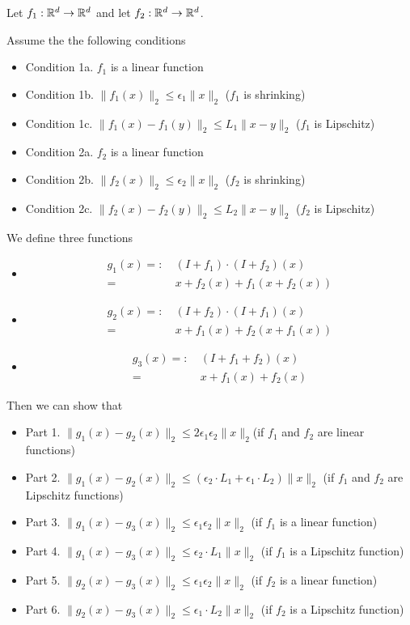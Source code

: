 \begin{lemma}
Let $f_1 : \mathbb{R}^d \rightarrow \mathbb{R}^d$ and let $f_2 : \mathbb{R}^d \rightarrow \mathbb{R}^d$.

Assume the the following conditions
\begin{itemize}
    \item Condition 1a. $f_1$ is a linear function 
    \item Condition 1b. $\| f_1(x) \|_2 \leq \epsilon_1 \| x \|_2$ ($f_1$ is shrinking)
    \item Condition 1c. $\| f_1 (x)  -f_1(y) \|_2 \leq L_1 \| x - y \|_2$ ($f_1$ is Lipschitz)
    \item Condition 2a. $f_2$ is a linear function 
    \item Condition 2b. $\| f_2(x) \|_2 \leq \epsilon_2 \| x \|_2$  ($f_2$ is shrinking)
    \item Condition 2c. $\| f_2 (x)  -f_2(y) \|_2 \leq L_2 \| x - y \|_2$ ($f_2$ is Lipschitz)
\end{itemize}

We define three functions
\begin{itemize}
\item 
\begin{align*}
g_1 (x) = : & ~ (I + f_1) \cdot (I + f_2) (x)  \\
= & ~ x + f_2(x) + f_1 ( x + f_2(x) )
\end{align*}
\item
\begin{align*}
g_2 (x) = : & ~ (I + f_2) \cdot (I + f_1) (x)  \\
= & ~ x + f_1(x) + f_2 ( x + f_1(x) )
\end{align*}
\item
\begin{align*}
g_3 (x) = : & ~ (I + f_1 + f_2) (x)  \\
= & ~ x + f_1(x) + f_2(x)
\end{align*}
\end{itemize}
Then we can show that
\begin{itemize}
    \item Part 1. $\| g_1 (x) - g_2 (x) \|_2 \leq 2 \epsilon_1 \epsilon_2 \| x \|_2$(if $f_1$ and $f_2$ are linear functions)
    \item Part 2. $\| g_1 (x) - g_2 (x) \|_2 \leq (\epsilon_2 \cdot L_1+ \epsilon_1 \cdot L_2) \| x \|_2  $  (if $f_1$ and $f_2$ are Lipschitz functions)
    \item Part 3. $\| g_1 (x) -g_3 (x) \|_2 \leq \epsilon_1 \epsilon_2 \| x \|_2$ (if $f_1$ is a linear function)
    \item Part 4. $\| g_1 (x) -g_3 (x) \|_2 \leq \epsilon_2 \cdot L_1 \| x \|_2$ (if $f_1$ is a Lipschitz function)
    \item Part 5.  $\| g_2 (x) -g_3 (x) \|_2 \leq \epsilon_1 \epsilon_2 \| x \|_2$ (if $f_2$ is a linear function)
    \item Part 6. $\| g_2 (x) -g_3 (x) \|_2 \leq \epsilon_1 \cdot L_2 \| x \|_2$ (if $f_2$ is a Lipschitz function)
\end{itemize}
\end{lemma}
